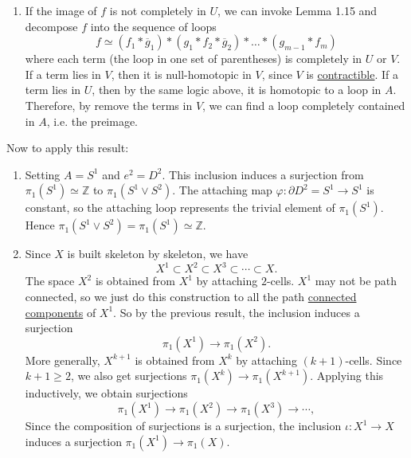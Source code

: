 \begin{solution}
\begin{enumerate}
			\item If the image of $f$ is not completely in $U$, we can invoke Lemma 1.15 and decompose $f$ into the sequence of loops 
				\begin{equation}
					f \simeq (f_1 \ast \overline{g}_1) \ast (g_1 \ast f_2 \ast \overline{g}_2) \ast \ldots \ast (g_{m-1} \ast f_m)
				\end{equation}
				where each term (the loop in one set of parentheses) is completely in $U$ or $V$. If a term lies in $V$, then it is null-homotopic in $V$, since $V$ is \hyperref[def:contractible]{contractible}. If a term lies in $U$, then by the same logic above, it is homotopic to a loop in $A$. Therefore, by remove the terms in $V$, we can find a loop completely contained in $A$, i.e. the preimage. 
		\end{enumerate}

		Now to apply this result: 
		\begin{enumerate}
			\item Setting $A = S^1$ and $e^2 = D^2$. This inclusion induces a surjection from $\pi_1(S^1) \simeq \mathbb{Z}$ to $\pi_1 (S^1 \vee S^2)$. The attaching map $\varphi:\partial D^2 = S^1 \to S^1$ is constant, so the attaching loop represents the trivial element of $\pi_1(S^1)$. Hence $\pi_1(S^1 \vee S^2) = \pi_1(S^1) \simeq \mathbb{Z}$. 

			\item Since $X$ is built skeleton by skeleton, we have
				\begin{equation}
					X^1 \subset X^2 \subset X^3 \subset \cdots \subset X.
				\end{equation}
				The space $X^2$ is obtained from $X^1$ by attaching $2$-cells. $X^1$ may not be path connected, so we just do this construction to all the path \hyperref[pst-def:connected-components]{connected components} of $X^1$. So by the previous result, the inclusion induces a surjection
				\begin{equation}
					\pi_1(X^1) \to \pi_1(X^2).
				\end{equation}
				More generally, $X^{k+1}$ is obtained from $X^k$ by attaching $(k+1)$-cells. Since $k+1\ge 2$, we also get surjections $\pi_1(X^k)\to\pi_1(X^{k+1})$. Applying this inductively, we obtain surjections
				\begin{equation}
					\pi_1(X^1)\to\pi_1(X^2)\to\pi_1(X^3)\to\cdots,
				\end{equation}
				Since the composition of surjections is a surjection, the inclusion $\iota: X^1 \to X$ induces a surjection $\pi_1 (X^1) \to \pi_1 (X)$. 
		\end{enumerate}
	\end{solution}

